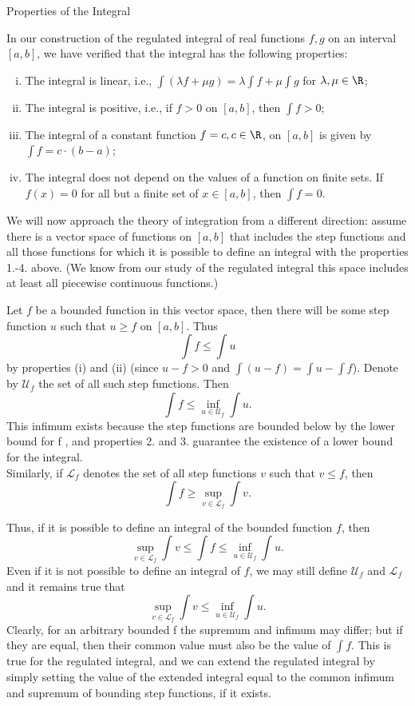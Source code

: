 \documentclass[smaller,hyperref={CJKbookmarks=true}]{beamer}
\begin{document}
\begin{frame}{Properties of the Integral}
\begin{spacing}{1.05}
In our construction of the regulated integral of real functions $f,g$ on an
interval $[a,b]$, we have verified that the integral has the following properties:
\begin{enumerate}[(i)]
  \item The integral is linear, i.e., $\int(\lambda f+\mu g)=\lambda\int f+\mu\int g$ for $\lambda,\mu\in\R$;
  \item The integral is positive, i.e., if $f>0$ on $[a,b]$, then $\int f>0$;
  \item The integral of a constant function $f=c,c\in\R$, on $[a,b]$ is given by $\int f=c\cdot(b-a)$;
  \item The integral does not depend on the values of a function on finite
sets. If $f(x)=0$ for all but a finite set of $x\in[a,b]$, then $\int f=0$.
\end{enumerate}
We will now approach the theory of integration from a dif{}ferent direction:
assume there is a vector space of functions on $[a,b]$ that includes the step
functions and all those functions for which it is possible to define an
integral with the properties 1.-4. above. (We know from our study of the
regulated integral this space includes at least all piecewise continuous
functions.)
\end{spacing}
\newpage
\begin{spacing}{0.8}
Let $f$ be a bounded function in this vector space, then there will be some
step function $u$ such that $u\geq f$ on $[a,b]$. Thus
\[\int f\leq\int u\]
by properties (i) and (ii) (since $u-f>0$ and $\int(u-f)=\int u-\int f$). Denote by $\mathcal{U}_f$ the set of all such step functions. Then
\[\int f\leq\inf_{u\in\mathcal{U}_f}\int u.\]
This infimum exists because the step functions are bounded below by the
lower bound for f , and properties 2. and 3. guarantee the existence of a
lower bound for the integral.\\[5pt]
Similarly, if $\mathcal{L}_f$ denotes the set of all step functions $v$ such that $v\leq f$, then
\[\int f\geq\sup_{v\in\mathcal{L}_f}\int v.\]
\end{spacing}
\newpage
\begin{spacing}{1.1}
Thus, if it is possible to define an integral of the bounded function $f$, then
\[\sup_{v\in\mathcal{L}_f}\int v\leq\int f\leq\inf_{u\in\mathcal{U}_f}\int u.\]
Even if it is not possible to define an integral of $f$, we may still define $\mathcal{U}_f$ and $\mathcal{L}_f$ and it remains true that
\[\sup_{v\in\mathcal{L}_f}\int v\leq\inf_{u\in\mathcal{U}_f}\int u.\]
Clearly, for an arbitrary bounded f the supremum and infimum may dif{}fer;
but if they are equal, then their common value must also be the value of $\int f$. This is true for the regulated integral, and we can extend the
regulated integral by simply setting the value of the extended integral
equal to the common infimum and supremum of bounding step functions,
if it exists.
\end{spacing}
\end{frame}
\end{document}
